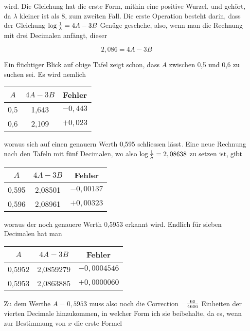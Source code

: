 \documentclass[twoside,12pt, showframe]{memoir}
\let\oldfrac\frac
\def\frac#1#2{\mathchoice{\tfrac{#1}{#2}}{\oldfrac{#1}{#2}}{\genfrac{}{}{}{2}{#1}{#2\mathstrut}}{\genfrac{}{}{}{3}{#1}{#2\mathstrut}}}
\begin{document}
wird. Die Gleichung hat die erste Form, mithin eine positive Wurzel, und gehört, da \(\lambda\) kleiner ist als 8, zum zweiten Fall. Die erste Operation besteht darin, dass der Gleichung \(\log \frac{1}{\lambda}=4 A-3 B\) Genüge geschehe, also, wenn man die Rechnung mit drei Decimalen anfängt, dieser

\[
2,086=4 A-3 B
\]

Ein flüchtiger Blick auf obige Tafel zeigt schon, dass \(A\) zwischen 0,5 und 0,6 zu suchen sei. Es wird nemlich

\begin{center}
\begin{tabular}{c|c|c}
\(A\) & \(4 A-3 B\) & Fehler \\
\hline
0,5 & 1,643 & \(-0,443\) \\
0,6 & 2,109 & \(+0,023\) \\
\end{tabular}
\end{center}

woraus sich auf einen genauern Werth 0,595 schliessen lässt. Eine neue Rechnung nach den Tafeln mit fünf Decimalen, wo also \(\log \frac{1}{\lambda}=2,08638\) zu setzen ist, gibt

\begin{center}
\begin{tabular}{c|c|c}
\(A\) & \(4 A-3 B\) & Fehler \\
\hline
0,595 & 2,08501 & \(-0,00137\) \\
0,596 & 2,08961 & \(+0,00323\) \\
\end{tabular}
\end{center}

woraus der noch genauere Werth 0,5953 erkannt wird. Endlich für sieben Decimalen hat man

\begin{center}
\begin{tabular}{c|c|c}
\(A\) & \(4 A-3 B\) & Fehler \\
\hline
0,5952 & 2,0859279 & \(-0,0004546\) \\
0,5953 & 2,0863885 & \(+0,0000060\) \\
\end{tabular}
\end{center}

Zu dem Werthe \(A=0,5953\) muss also noch die Correction \(-\frac{60}{4606}\) Einheiten der vierten Decimale hinzukommen, in welcher Form ich sie beibehalte, da es, wenn zur Bestimmung von \(x\) die erste Formel
\end{document}
